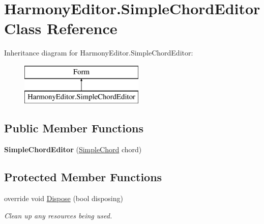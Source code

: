 \hypertarget{class_harmony_editor_1_1_simple_chord_editor}{\section{Harmony\+Editor.\+Simple\+Chord\+Editor Class Reference}
\label{class_harmony_editor_1_1_simple_chord_editor}
}
Inheritance diagram for Harmony\+Editor.\+Simple\+Chord\+Editor\+:\begin{figure}[H]
\begin{center}
\leavevmode
\includegraphics[height=2.000000cm]{class_harmony_editor_1_1_simple_chord_editor}
\end{center}
\end{figure}
\subsection*{Public Member Functions}
\begin{DoxyCompactItemize}
\item 
\hypertarget{class_harmony_editor_1_1_simple_chord_editor_a0f53a8a071c6351dfbee7a5806d49753}{{\bfseries Simple\+Chord\+Editor} (\hyperlink{class_periodic_chords_1_1_simple_chord}{Simple\+Chord} chord)}\label{class_harmony_editor_1_1_simple_chord_editor_a0f53a8a071c6351dfbee7a5806d49753}

\end{DoxyCompactItemize}
\subsection*{Protected Member Functions}
\begin{DoxyCompactItemize}
\item 
override void \hyperlink{class_harmony_editor_1_1_simple_chord_editor_a9293aff01254ab51d2765bcfebe28d53}{Dispose} (bool disposing)
\begin{DoxyCompactList}\small\item\em Clean up any resources being used. \end{DoxyCompactList}\end{DoxyCompactItemize}
